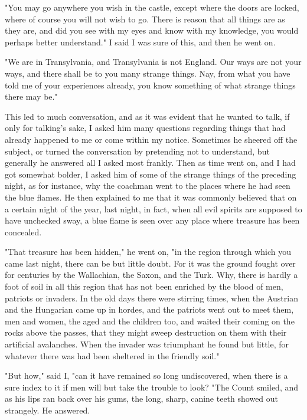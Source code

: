"You may go anywhere you wish in the castle, except where the doors are locked, where of course you will not wish to go. There is reason that all things are as they are, and did you see with my eyes and know with my knowledge, you would perhaps better understand." I said I was sure of this, and then he went on. 

"We are in Transylvania, and Transylvania is not England. Our ways are not your ways, and there shall be to you many strange things. Nay, from what you have told me of your experiences already, you know something of what strange things there may be." 

This led to much conversation, and as it was evident that he wanted to talk, if only for talking's sake, I asked him many questions regarding things that had already happened to me or come within my notice. Sometimes he sheered off the subject, or turned the conversation by pretending not to understand, but generally he answered all I asked most frankly. Then as time went on, and I had got somewhat bolder, I asked him of some of the strange things of the preceding night, as for instance, why the coachman went to the places where he had seen the blue flames. He then explained to me that it was commonly believed that on a certain night of the year, last night, in fact, when all evil spirits are supposed to have unchecked sway, a blue flame is seen over any place where treasure has been concealed. 

"That treasure has been hidden," he went on, "in the region through which you came last night, there can be but little doubt. For it was the ground fought over for centuries by the Wallachian, the Saxon, and the Turk. Why, there is hardly a foot of soil in all this region that has not been enriched by the blood of men, patriots or invaders. In the old days there were stirring times, when the Austrian and the Hungarian came up in hordes, and the patriots went out to meet them, men and women, the aged and the children too, and waited their coming on the rocks above the passes, that they might sweep destruction on them with their artificial avalanches. When the invader was triumphant he found but little, for whatever there was had been sheltered in the friendly soil." 

"But how," said I, "can it have remained so long undiscovered, when there is a sure index to it if men will but take the trouble to look? "The Count smiled, and as his lips ran back over his gums, the long, sharp, canine teeth showed out strangely. He answered. 

